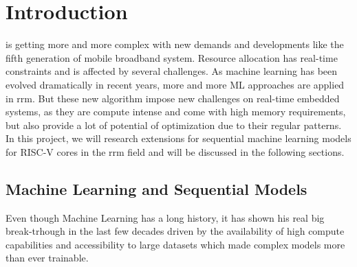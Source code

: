
\chapter{Introduction}

 is getting more and more complex with new demands and developments like the fifth generation of mobile broadband system. Resource allocation has real-time constraints and is affected by several challenges. As machine learning has been evolved dramatically in recent years, more and more ML approaches are applied in \gls{rrm}. But these new algorithm impose new challenges on real-time embedded systems, as they are compute intense and come with high memory requirements, but also provide a lot of potential of optimization due to their regular patterns. In this project, we will research extensions for sequential machine learning models for RISC-V cores in the \gls{rrm} field and will be discussed in the following sections.

\section{Machine Learning and Sequential Models}

Even though Machine Learning has a long history, it has shown his real big break-trhough in the last few decades driven by the availability of high compute capabilities and accessibility to large datasets which made complex models more than ever trainable. 

